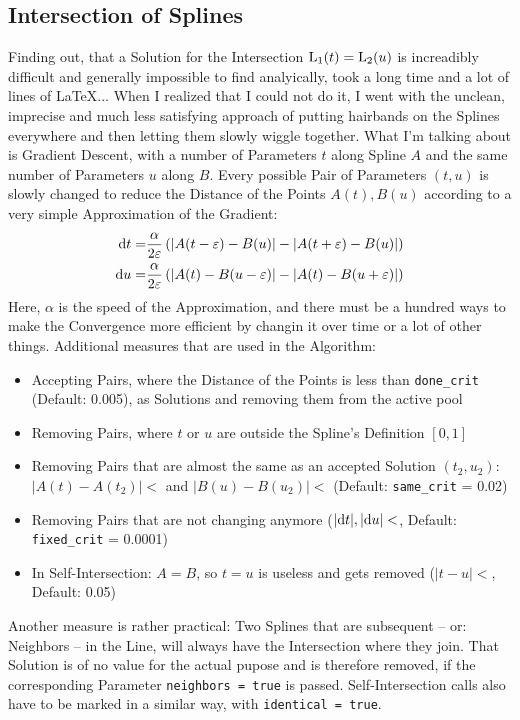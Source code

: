 \subsection{Intersection of Splines}
	Finding out, that a Solution for the Intersection $\operatorname{L}_1(t) = \operatorname{L}_2(u)$ is increadibly difficult and generally impossible to find analyically, took a long time and a lot of lines of \LaTeX... When I realized that I could not do it, I went with the unclean, imprecise and much less satisfying approach of putting hairbands on the Splines everywhere and then letting them slowly wiggle together.
	What I'm talking about is Gradient Descent, with a number of Parameters $t$ along Spline $A$ and the same number of Parameters $u$ along $B$. Every possible Pair of Parameters $(t, u)$ is slowly changed to reduce the Distance of the Points $A(t), B(u)$ according to a very simple Approximation of the Gradient:
	$$\begin{aligned}
		{\rm d}{}t =& \frac{\alpha}{2\varepsilon} \left(\left|A(t-\varepsilon) - B(u)\right| - \left|A(t+\varepsilon) - B(u)\right|\right)\\
		{\rm d}{}u =& \frac{\alpha}{2\varepsilon} \left(\left|A(t) - B(u-\varepsilon)\right| - \left|A(t) - B(u+\varepsilon)\right|\right) \\
	\end{aligned}$$
	Here, $\alpha$ is the speed of the Approximation, and there must be a hundred ways to make the Convergence more efficient by changin it over time or a lot of other things. Additional measures that are used in the Algorithm:
	\begin{itemize}
		\item Accepting Pairs, where the Distance of the Points is less than {\tt done\_crit} (Default: 0.005), as Solutions and removing them from the active pool
		\item Removing Pairs, where $t$ or $u$ are outside the Spline's Definition $[0, 1]$
		\item Removing Pairs that are almost the same as an accepted Solution $(t_2, u_2)$: $|A(t) - A(t_2)| < $\phantom{.}{\tt same\_crit} and $|B(u) - B(u_2)| < $\phantom{.}{\tt same\_crit} (Default: {\tt same\_crit} = 0.02)
		\item Removing Pairs that are not changing anymore ($|{\rm d}{}t|, |{\rm d}{}u| < $\phantom{.}{\tt fixed\_crit}, Default: {\tt fixed\_crit} = 0.0001)
		\item In Self-Intersection: $A = B$, so $t = u$ is useless and gets removed ($|t - u| < $\phantom{.}{\tt identical\_crit}, Default: 0.05)
	\end{itemize}
	Another measure is rather practical: Two Splines that are subsequent – or: Neighbors – in the Line, will always have the Intersection where they join. That Solution is of no value for the actual pupose and is therefore removed, if the corresponding Parameter {\tt neighbors = true} is passed. Self-Intersection calls also have to be marked in a similar way, with {\tt identical = true}.
